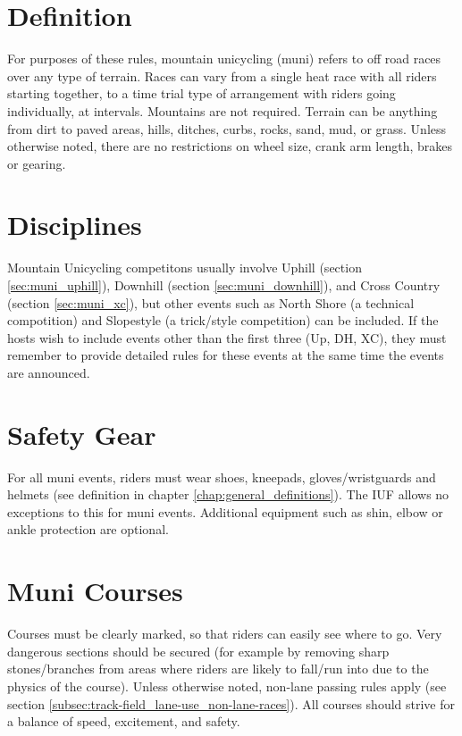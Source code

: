 
\section{Definition}
For purposes of these rules, mountain unicycling (muni) refers to off road races over any type of terrain.
Races can vary from a single heat race with all riders starting together, to a time trial type of arrangement with riders going individually, at intervals.
Mountains are not required.
Terrain can be anything from dirt to paved areas, hills, ditches, curbs, rocks, sand, mud, or grass.
Unless otherwise noted, there are no restrictions on wheel size, crank arm length, brakes or gearing.

\section{Disciplines}
Mountain Unicycling competitons usually involve Uphill (section \ref{sec:muni_uphill}), Downhill (section \ref{sec:muni_downhill}), and Cross Country (section \ref{sec:muni_xc}), but other events such as North Shore (a technical compotition) and Slopestyle (a trick/style competition) can be included.
If the hosts wish to include events other than the first three (Up, DH, XC), they must remember to provide detailed rules for these events at the same time the events are announced.

\section{Safety Gear}
For all muni events, riders must wear shoes, kneepads, gloves/wristguards and helmets (see definition in chapter \ref{chap:general_definitions}).
The IUF allows no exceptions to this for muni events.
Additional equipment such as shin, elbow or ankle protection are optional.

\section{Muni Courses}
Courses must be clearly marked, so that riders can easily see where to go.
Very dangerous sections should be secured (for example by removing sharp stones/branches from areas where riders are likely to fall/run into due to the physics of the course).
Unless otherwise noted, non-lane passing rules apply (see section \ref{subsec:track-field_lane-use_non-lane-races}).
All courses should strive for a balance of speed, excitement, and safety.

